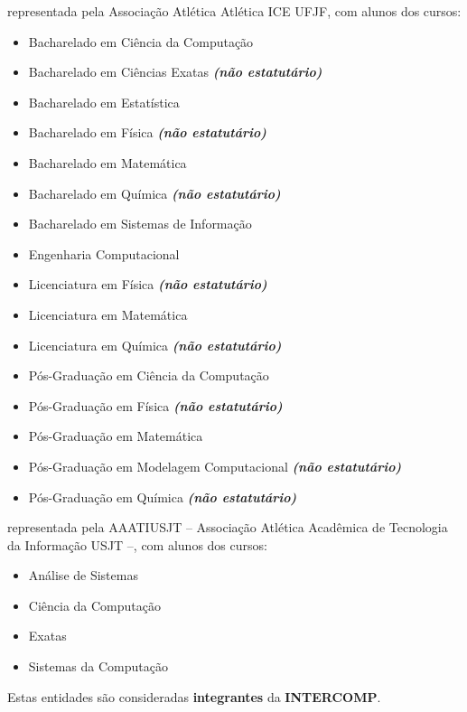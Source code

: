 \begin{article}
\begin{description}[noitemsep]
		\item[UFJF] representada pela Associação Atlética Atlética ICE UFJF, com alunos dos cursos:
		\begin{itemize}[noitemsep]
			\item Bacharelado em Ciência da Computação
			\item Bacharelado em Ciências Exatas \textbf{\textit{(não estatutário)}}
			\item Bacharelado em Estatística
			\item Bacharelado em Física \textbf{\textit{(não estatutário)}}
			\item Bacharelado em Matemática
			\item Bacharelado em Química \textbf{\textit{(não estatutário)}}
			\item Bacharelado em Sistemas de Informação
			\item Engenharia Computacional
			\item Licenciatura em Física \textbf{\textit{(não estatutário)}}
			\item Licenciatura em Matemática
			\item Licenciatura em Química \textbf{\textit{(não estatutário)}}
			\item Pós-Graduação em Ciência da Computação
			\item Pós-Graduação em Física \textbf{\textit{(não estatutário)}}
			\item Pós-Graduação em Matemática
			\item Pós-Graduação em Modelagem Computacional \textbf{\textit{(não estatutário)}}
			\item Pós-Graduação em Química \textbf{\textit{(não estatutário)}}
		\end{itemize}

		\item[Universidade São Judas Tadeu] representada pela AAATIUSJT -- Associação Atlética Acadêmica de Tecnologia da Informação USJT --, com alunos dos cursos:
		\begin{itemize}[noitemsep]
			\item Análise de Sistemas
			\item Ciência da Computação
			\item Exatas
			\item Sistemas da Computação
		\end{itemize}
	\end{description}

	\begin{xparagraph}
		Estas entidades são consideradas \textbf{integrantes} da \textbf{INTERCOMP}.
	\end{xparagraph}


\end{article}
